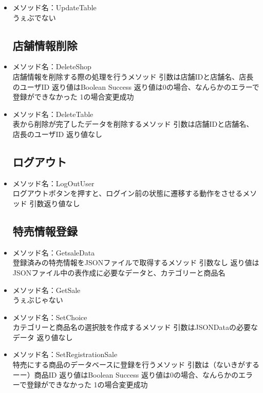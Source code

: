 \documentclass[a4j]{jarticle}
\begin{document}
\begin{itemize}
\item メソッド名：UpdateTable\\

うぇぶでない
\subsection{店舗情報削除}
%
\item メソッド名：DeleteShop\\

店舗情報を削除する際の処理を行うメソッド
引数は店舗IDと店舗名、店長のユーザID
返り値はBoolean Success
返り値は0の場合、なんらかのエラーで登録ができなかった
1の場合変更成功

\item メソッド名：DeleteTable\\

表から削除が完了したデータを削除するメソッド
引数は店舗IDと店舗名、店長のユーザID
返り値なし

\subsection{ログアウト}
%
\item メソッド名：LogOutUser\\
ログアウトボタンを押すと、ログイン前の状態に遷移する動作をさせるメソッド
引数返り値なし
%
\subsection{特売情報登録}
\item メソッド名：GetsaleData\\

登録済みの特売情報をJSONファイルで取得するメソッド
引数なし
返り値はJSONファイル中の表作成に必要なデータと、カテゴリーと商品名

\item メソッド名：GetSale\\

うぇぶじゃない

\item メソッド名：SetChoice\\

カテゴリーと商品名の選択肢を作成するメソッド
引数はJSONDataの必要なデータ
返り値なし

\item メソッド名：SetRegistrationSale\\

特売にする商品のデータベースに登録を行うメソッド
引数は（ないきがするーー）商品ID
返り値はBoolean Success
返り値は0の場合、なんらかのエラーで登録ができなかった
1の場合変更成功


\end{itemize}
\end{document}
